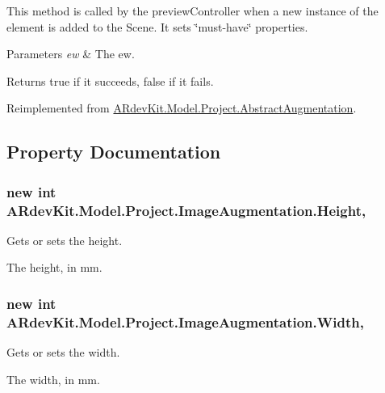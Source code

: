 This method is called by the preview\-Controller when a new instance of the element is added to the Scene. It sets \char`\"{}must-\/have\char`\"{} properties. 


\begin{DoxyParams}{Parameters}
{\em ew} & The ew.\\
\hline
\end{DoxyParams}
\begin{DoxyReturn}{Returns}
true if it succeeds, false if it fails. 
\end{DoxyReturn}


Reimplemented from \hyperlink{class_a_rdev_kit_1_1_model_1_1_project_1_1_abstract_augmentation_a8b02a2eb775b8147e71575694ce8a38f}{A\-Rdev\-Kit.\-Model.\-Project.\-Abstract\-Augmentation}.



\subsection{Property Documentation}
\hypertarget{class_a_rdev_kit_1_1_model_1_1_project_1_1_image_augmentation_a5cecd83037a573b7f4fdfc7ebe6c7476}{
\subsubsection[{Height}]{\setlength{\rightskip}{0pt plus 5cm}new int A\-Rdev\-Kit.\-Model.\-Project.\-Image\-Augmentation.\-Height\hspace{0.3cm}{\ttfamily [get]}, {\ttfamily [set]}}}\label{class_a_rdev_kit_1_1_model_1_1_project_1_1_image_augmentation_a5cecd83037a573b7f4fdfc7ebe6c7476}


Gets or sets the height. 

The height, in mm. \hypertarget{class_a_rdev_kit_1_1_model_1_1_project_1_1_image_augmentation_a372f087469a33d84950310dfcd52e190}{
\subsubsection[{Width}]{\setlength{\rightskip}{0pt plus 5cm}new int A\-Rdev\-Kit.\-Model.\-Project.\-Image\-Augmentation.\-Width\hspace{0.3cm}{\ttfamily [get]}, {\ttfamily [set]}}}\label{class_a_rdev_kit_1_1_model_1_1_project_1_1_image_augmentation_a372f087469a33d84950310dfcd52e190}


Gets or sets the width. 

The width, in mm. 